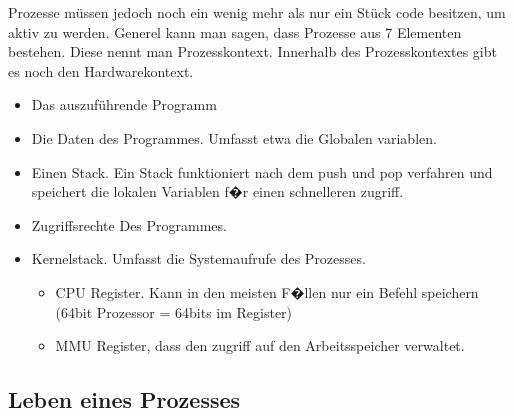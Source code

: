\documentclass[a4paper,13pt]{scrartcl}
\begin{document}
Prozesse müssen jedoch noch ein wenig mehr als nur ein Stück code besitzen, um aktiv zu werden. Generel kann man sagen, dass Prozesse aus 7 Elementen bestehen.
Diese nennt man Prozesskontext. Innerhalb des Prozesskontextes gibt es noch den Hardwarekontext.
\begin{itemize}
\setlength\itemsep{0.5mm}
\item Das auszuführende Programm
\item Die Daten des Programmes. Umfasst etwa die Globalen variablen.
\item Einen Stack. Ein Stack funktioniert nach dem push und pop verfahren und speichert die lokalen Variablen f�r einen schnelleren zugriff.
\item Zugriffsrechte Des Programmes.
\item Kernelstack. Umfasst die Systemaufrufe des Prozesses.
\begin{itemize}
\item CPU Register. Kann in den meisten F�llen nur ein Befehl speichern (64bit Prozessor = 64bits im Register)
\item MMU Register, dass den zugriff auf den Arbeitsspeicher verwaltet.
\end{itemize}
\end{itemize}

\subsection{Leben eines Prozesses}
\begin{center}
\end{center}
\end{document}
